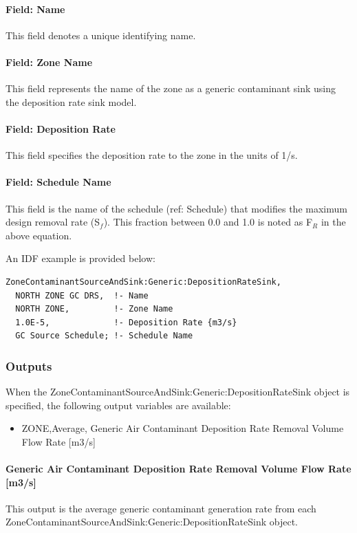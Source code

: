 \paragraph{Field: Name}\label{field-name-17-003}

This field denotes a unique identifying name.

\paragraph{Field: Zone Name}\label{field-zone-name-6-002}

This field represents the name of the zone as a generic contaminant sink using the deposition rate sink model.

\paragraph{Field: Deposition Rate}\label{field-deposition-rate}

This field specifies the deposition rate to the zone in the units of 1/s.

\paragraph{Field: Schedule Name}\label{field-schedule-name-10}

This field is the name of the schedule (ref: Schedule) that modifies the maximum design removal rate (S\(_{f}\)). This fraction between 0.0 and 1.0 is noted as F\(_{R}\) in the above equation.

An IDF example is provided below:

\begin{lstlisting}
ZoneContaminantSourceAndSink:Generic:DepositionRateSink,
  NORTH ZONE GC DRS,  !- Name
  NORTH ZONE,         !- Zone Name
  1.0E-5,             !- Deposition Rate {m3/s}
  GC Source Schedule; !- Schedule Name
\end{lstlisting}

\subsubsection{Outputs}\label{outputs-13-002}

When the ZoneContaminantSourceAndSink:Generic:DepositionRateSink object is specified, the following output variables are available:

\begin{itemize}
    \tightlist
  \item
    ZONE,Average, Generic Air Contaminant Deposition Rate Removal Volume Flow Rate {[}m3/s{]}
\end{itemize}

\paragraph{Generic Air Contaminant Deposition Rate Removal Volume Flow Rate {[}m3/s{]}}\label{generic-air-contaminant-deposition-rate-removal-volume-flow-rate-m3s}

This output is the average generic contaminant generation rate from each Zone\-Contaminant\-Source\-And\-Sink:\-Generic:\-Deposition\-Rate\-Sink object.

